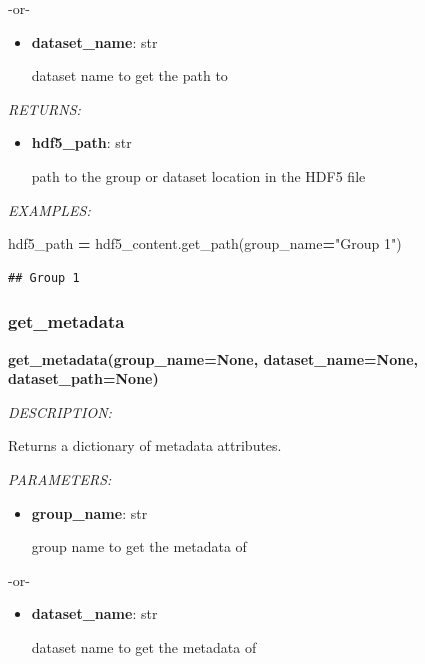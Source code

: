 \documentclass[
]{article}
\newenvironment{Shaded}{\begin{snugshade}}{\end{snugshade}}
\newcommand{\NormalTok}[1]{#1}
\newcommand{\OperatorTok}[1]{\textcolor[rgb]{0.81,0.36,0.00}{\textbf{#1}}}
\newcommand{\StringTok}[1]{\textcolor[rgb]{0.31,0.60,0.02}{#1}}
\begin{document}
-or-

\begin{itemize}
\item
  \textbf{dataset\_name}: str

  dataset name to get the path to
\end{itemize}

\emph{RETURNS:}

\begin{itemize}
\item
  \textbf{hdf5\_path}: str

  path to the group or dataset location in the HDF5 file
\end{itemize}

\emph{EXAMPLES:}

\begin{Shaded}
\begin{Highlighting}[]
\NormalTok{hdf5_path }\OperatorTok{=}\NormalTok{ hdf5_content.get_path(group_name}\OperatorTok{=}\StringTok{"Group 1"}\NormalTok{)}
\end{Highlighting}
\end{Shaded}

\begin{verbatim}
## Group 1
\end{verbatim}

\hypertarget{get_metadata}{%
\subsubsection{get\_metadata}\label{get_metadata}}

\textbf{get\_metadata(group\_name=None, dataset\_name=None, dataset\_path=None)}

\emph{DESCRIPTION:}

Returns a dictionary of metadata attributes.

\emph{PARAMETERS:}

\begin{itemize}
\item
  \textbf{group\_name}: str

  group name to get the metadata of
\end{itemize}

-or-

\begin{itemize}
\item
  \textbf{dataset\_name}: str

  dataset name to get the metadata of
\end{itemize}
\end{document}
